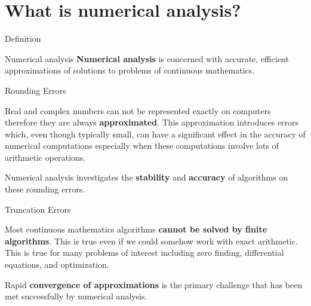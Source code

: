 \documentclass[12pt]{beamer}
\begin{document}
\section{What is numerical analysis?} 

\begin{frame}{Definition}


\begin{block}{Numerical analysis} 
{\bf Numerical analysis} is concerned with accurate, efficient approximations
of solutions to problems of continuous mathematics.
\end{block}
\end{frame} 

\begin{frame}{Rounding Errors} 
\begin{block}{}
Real and complex numbers can not be represented exactly on computers 
therefore they are always {\bf approximated}. This approximation introduces 
errors which, even though typically small, can have a significant effect 
in the accuracy of numerical computations especially when these 
computations involve lots of arithmetic operations. 
\end{block}

\begin{block}{}
Numerical analysis investigates the {\bf stability} and {\bf accuracy} of
algorithms on these rounding errors. 
\end{block}
\end{frame}


\begin{frame}{Truncation Errors} 

\begin{block}{}
Most continuous mathematics algorithms {\bf cannot be solved by finite algorithms}. 
This is true even if we could somehow work with exact arithmetic. This is true for many problems of interest including zero finding, differential equations, and optimization. 
\end{block}

\begin{block}{}
Rapid {\bf convergence of approximations} is the primary challenge that has been met 
successfully by numerical analysis.
\end{block}{}
\end{frame} 
\end{document}
